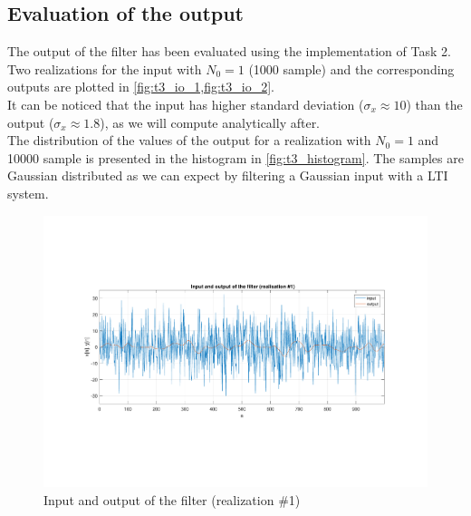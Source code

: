 \subsection{Evaluation of the output}
The output of the filter has been evaluated using the implementation of Task 2. Two realizations for the input with $N_0=1$ (1000 sample) and the corresponding outputs are plotted in \cref{fig:t3_io_1,fig:t3_io_2}. \\
It can be noticed that the input has higher standard deviation ($\sigma_x\approx 10$) than the output ($\sigma_x\approx 1.8$), as we will compute analytically after.\\
The distribution of the values of the output for a realization with $N_0=1$ and 10000 sample is presented in the histogram in \cref{fig:t3_histogram}. The samples are Gaussian distributed as we can expect by filtering a Gaussian input with a LTI system.
\begin{figure}[H]
	\centering
	\includegraphics[trim={2.5cm 5cm 2.5cm 5cm}, clip, width=\linewidth]{io_1}
	\caption{Input and output of the filter (realization \#1)}
	\label{fig:t3_io_1}
\end{figure}

